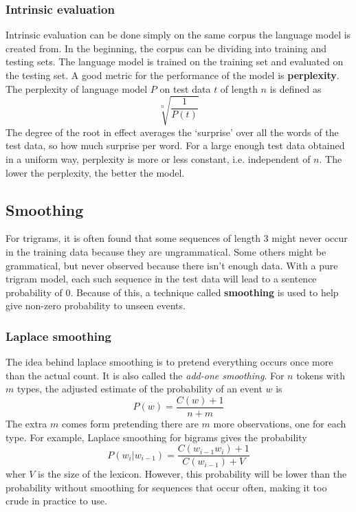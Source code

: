 \documentclass[Report.tex]{subfiles}
\begin{document}
\subsubsection{Intrinsic evaluation}
Intrinsic evaluation can be done simply on the same corpus the language model is created
from. In the beginning, the corpus can be dividing into training and testing sets. The
language model is trained on the training set and evaluated on the testing set. A good
metric for the performance of the model is \textbf{perplexity}.
The perplexity of language model $P$ on test data $t$ of length $n$ is defined as
\begin{equation}
\sqrt[n]{\frac{1}{P(t)}}
\end{equation}
The degree of the root in effect averages the `surprise' over all the words of the
test data, so how much surprise per word. For a large enough test data obtained in
a uniform way, perplexity is more or less constant, i.e. independent of $n$. The
lower the perplexity, the better the model.

\subsection{Smoothing}
For trigrams, it is often found that some sequences of length 3 might never
occur in the training data because they are ungrammatical. Some others might be
grammatical, but never observed because there isn't enough data. With a pure
trigram model, each such sequence in the test data will lead to a sentence
probability of 0. Because of this, a technique called \textbf{smoothing} is
used to help give non-zero probability to unseen events.

\subsubsection{Laplace smoothing}
The idea behind laplace smoothing is to pretend everything occurs once more
than the actual count. It is also called the \textit{add-one smoothing}.
For $n$ tokens with $m$ types, the adjusted estimate of the probability of
an event $w$ is
\begin{equation}
P(w) = \frac{C(w) + 1}{n + m}
\end{equation}
The extra $m$ comes form pretending there are $m$ more observations, one
for each type. For example, Laplace smoothing for bigrams gives
the probability
\begin{equation}
P(w_i | w_{i-1}) = \frac{C(w_{i-1}w_i) + 1}{C(w_{i-1}) + V}
\end{equation}
wher $V$ is the size of the lexicon. However, this probability will be
lower than the probability without smoothing for sequences that occur often,
making it too crude in practice to use.
\end{document}
